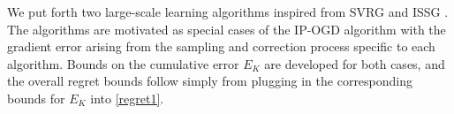\documentclass[draftcls,onecolumn,12pt]{IEEEtran}
\theoremstyle{plain}
\theoremstyle{plain}
\theoremstyle{remark}
\begin{document}
We put forth two large-scale learning algorithms inspired from SVRG  \cite{xiao2014proximal} and ISSG \cite{friedlander2012hybrid}. The algorithms are motivated as special cases of the IP-OGD algorithm with the gradient error arising from the sampling and correction process specific to each algorithm. Bounds on the cumulative error $E_K$ are developed for both cases, and the overall regret bounds follow simply from plugging in the corresponding bounds for $E_K$ into \eqref{regret1}. 
\end{document}
